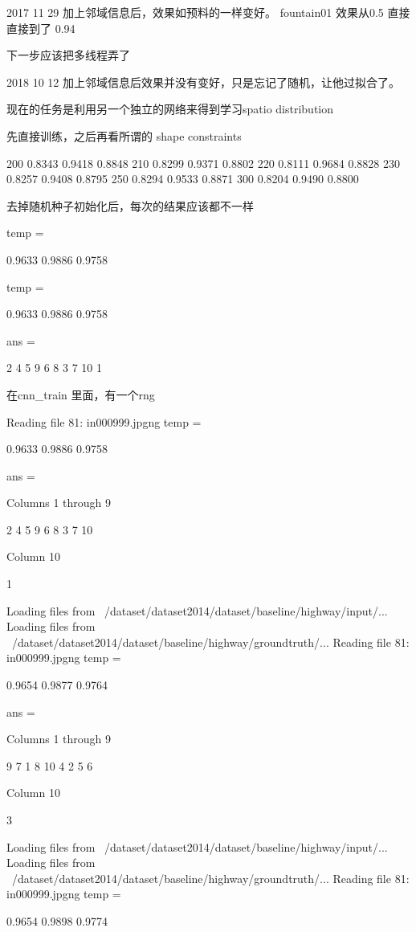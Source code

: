2017 11 29
加上邻域信息后，效果如预料的一样变好。
fountain01 效果从0.5 直接直接到了 0.94

下一步应该把多线程弄了

2018 10 12
加上邻域信息后效果并没有变好，只是忘记了随机，让他过拟合了。

现在的任务是利用另一个独立的网络来得到学习spatio distribution

先直接训练，之后再看所谓的 shape constraints


200 0.8343    0.9418    0.8848
210 0.8299    0.9371    0.8802
220 0.8111    0.9684    0.8828
230 0.8257    0.9408    0.8795
250 0.8294    0.9533    0.8871
300 0.8204    0.9490    0.8800


去掉随机种子初始化后，每次的结果应该都不一样

temp =

    0.9633    0.9886    0.9758


temp =

    0.9633    0.9886    0.9758


ans =

     2     4     5     9     6     8     3     7    10     1

在cnn_train 里面，有一个rng


Reading file 81: in000999.jpgng
temp =

    0.9633    0.9886    0.9758


ans =

  Columns 1 through 9

     2     4     5     9     6     8     3     7    10

  Column 10

     1

Loading files from ~/dataset/dataset2014/dataset/baseline/highway/input/...
Loading files from ~/dataset/dataset2014/dataset/baseline/highway/groundtruth/...
Reading file 81: in000999.jpgng
temp =

    0.9654    0.9877    0.9764


ans =

  Columns 1 through 9

     9     7     1     8    10     4     2     5     6

  Column 10

     3

Loading files from ~/dataset/dataset2014/dataset/baseline/highway/input/...
Loading files from ~/dataset/dataset2014/dataset/baseline/highway/groundtruth/...
Reading file 81: in000999.jpgng
temp =

    0.9654    0.9898    0.9774



